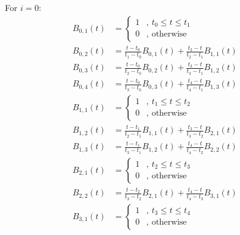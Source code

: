 \documentclass[a4paper,10pt]{article}
\begin{document}
\noindent
For $i = 0$:
\begin{equation}
\left.\begin{aligned}
B_{0, 1}(t) &=
\begin{cases}
   1 & \text{, } t_0 \leq t \leq t_1 \\
   0 & \text{, otherwise}
  \end{cases}& \\
B_{0,2}(t) &= \frac{t-t_0}{t_1-t_0}B_{0,1}(t) + \frac{t_2-t}{t_2-t_1}B_{1,1}(t)& \\
B_{0,3}(t) &= \frac{t-t_0}{t_2-t_0}B_{0,2}(t) + \frac{t_3-t}{t_3-t_1}B_{1,2}(t)& \\
B_{0,4}(t) &= \frac{t-t_0}{t_3-t_0}B_{0,3}(t) + \frac{t_4-t}{t_4-t_1}B_{1,3}(t)&\\
B_{1,1}(t) &= \begin{cases}
   1 & \text{, } t_1 \leq t \leq t_2 \\
   0 & \text{, otherwise}
  \end{cases}&\\
B_{1,2}(t) &= \frac{t-t_1}{t_2-t_1}B_{1,1}(t) + \frac{t_3-t}{t_3-t_2}B_{2,1}(t)& \\
B_{1,3}(t) &= \frac{t-t_1}{t_3-t_1}B_{1,2}(t) + \frac{t_4-t}{t_4-t_2}B_{2,2}(t)& \\
B_{2,1}(t) &= \begin{cases}
   1 & \text{, } t_2 \leq t \leq t_3 \\
   0 & \text{, otherwise}
  \end{cases}&\\
B_{2,2}(t) &= \frac{t-t_2}{t_3-t_2}B_{2,1}(t) + \frac{t_4-t}{t_4-t_3}B_{3,1}(t)& \\
B_{3,1}(t) &= \begin{cases}
   1 & \text{, } t_3 \leq t \leq t_4 \\
   0 & \text{, otherwise}
  \end{cases}&\\\\
\end{aligned}\right.
\end{equation}
\end{document}
